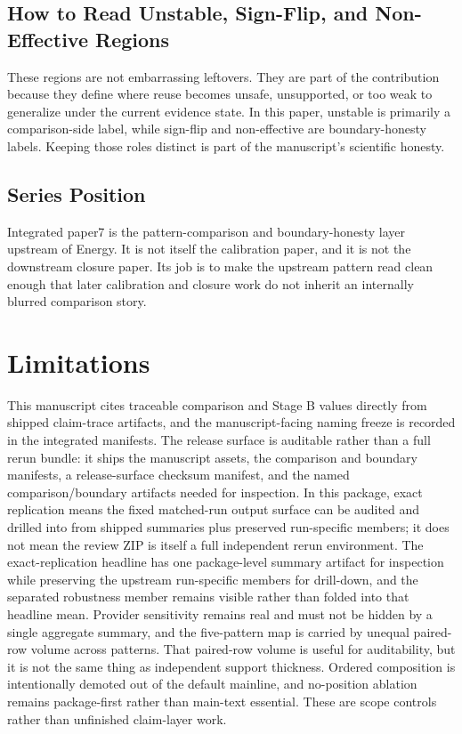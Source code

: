 \documentclass[11pt,a4paper]{article}
\begin{document}
\subsection{How to Read Unstable, Sign-Flip, and Non-Effective Regions}

These regions are not embarrassing leftovers. They are part of the contribution because they define where reuse becomes unsafe, unsupported, or too weak to generalize under the current evidence state. In this paper, unstable is primarily a comparison-side label, while sign-flip and non-effective are boundary-honesty labels. Keeping those roles distinct is part of the manuscript's scientific honesty.

\subsection{Series Position}

Integrated paper7 is the pattern-comparison and boundary-honesty layer upstream of Energy. It is not itself the calibration paper, and it is not the downstream closure paper. Its job is to make the upstream pattern read clean enough that later calibration and closure work do not inherit an internally blurred comparison story.

\section{Limitations}
\label{sec:limitations}

This manuscript cites traceable comparison and Stage B values directly from shipped claim-trace artifacts, and the manuscript-facing naming freeze is recorded in the integrated manifests. The release surface is auditable rather than a full rerun bundle: it ships the manuscript assets, the comparison and boundary manifests, a release-surface checksum manifest, and the named comparison/boundary artifacts needed for inspection. In this package, exact replication means the fixed matched-run output surface can be audited and drilled into from shipped summaries plus preserved run-specific members; it does not mean the review ZIP is itself a full independent rerun environment. The exact-replication headline has one package-level summary artifact for inspection while preserving the upstream run-specific members for drill-down, and the separated robustness member remains visible rather than folded into that headline mean. Provider sensitivity remains real and must not be hidden by a single aggregate summary, and the five-pattern map is carried by unequal paired-row volume across patterns. That paired-row volume is useful for auditability, but it is not the same thing as independent support thickness. Ordered composition is intentionally demoted out of the default mainline, and no-position ablation remains package-first rather than main-text essential. These are scope controls rather than unfinished claim-layer work.
\end{document}
